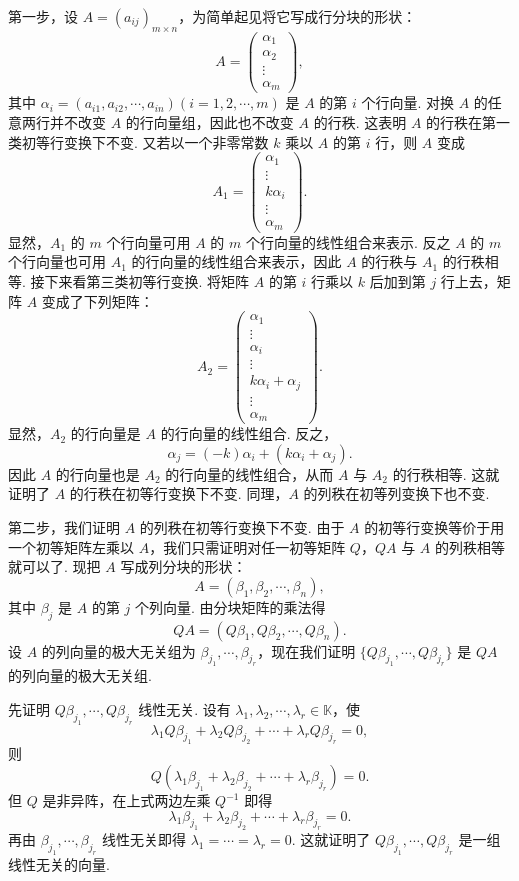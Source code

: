 \documentclass[UTF8, 12pt, fontset=fandol, oneside]{ctexart}
\begin{document}
第一步，设 $A=(a_{ij})_{m\times n}$，为简单起见将它写成行分块的形状：
\[
A=\left(\begin{array}{c}
\alpha_1\\
\alpha_2\\
\vdots\\
\alpha_m
\end{array}\right),
\]
其中 $\alpha_i=(a_{i1},a_{i2},\cdots,a_{in})(i=1,2,\cdots,m)$ 是 $A$ 的第 $i$ 个行向量. 对换 $A$ 的任意两行并不改变 $A$ 的行向量组，因此也不改变 $A$ 的行秩. 这表明 $A$ 的行秩在第一类初等行变换下不变. 又若以一个非零常数 $k$ 乘以 $A$ 的第 $i$ 行，则 $A$ 变成
\[
A_1=\left(\begin{array}{c}
\alpha_1\\
\vdots\\
k\alpha_i\\
\vdots\\
\alpha_m
\end{array}\right).
\]
显然，$A_1$ 的 $m$ 个行向量可用 $A$ 的 $m$ 个行向量的线性组合来表示. 反之 $A$ 的 $m$ 个行向量也可用 $A_1$ 的行向量的线性组合来表示，因此 $A$ 的行秩与 $A_1$ 的行秩相等. 接下来看第三类初等行变换. 将矩阵 $A$ 的第 $i$ 行乘以 $k$ 后加到第 $j$ 行上去，矩阵 $A$ 变成了下列矩阵：
\[
A_2=\left(\begin{array}{c}
\alpha_1\\
\vdots\\
\alpha_i\\
\vdots\\
k\alpha_i+\alpha_j\\
\vdots\\
\alpha_m
\end{array}\right).
\]
显然，$A_2$ 的行向量是 $A$ 的行向量的线性组合. 反之，
\[
\alpha_j=(-k)\alpha_i+(k\alpha_i+\alpha_j).
\]
因此 $A$ 的行向量也是 $A_2$ 的行向量的线性组合，从而 $A$ 与 $A_2$ 的行秩相等. 这就证明了 $A$ 的行秩在初等行变换下不变. 同理，$A$ 的列秩在初等列变换下也不变.

第二步，我们证明 $A$ 的列秩在初等行变换下不变. 由于 $A$ 的初等行变换等价于用一个初等矩阵左乘以 $A$，我们只需证明对任一初等矩阵 $Q$，$QA$ 与 $A$ 的列秩相等就可以了. 现把 $A$ 写成列分块的形状：
\[
A=(\beta_1,\beta_2,\cdots,\beta_n),
\]
其中 $\beta_j$ 是 $A$ 的第 $j$ 个列向量. 由分块矩阵的乘法得
\[
QA=(Q\beta_1,Q\beta_2,\cdots,Q\beta_n).
\]
设 $A$ 的列向量的极大无关组为 $\beta_{j_1},\cdots,\beta_{j_r}$，现在我们证明 $\{Q\beta_{j_1},\cdots,Q\beta_{j_r}\}$ 是 $QA$ 的列向量的极大无关组.

先证明 $Q\beta_{j_1},\cdots,Q\beta_{j_r}$ 线性无关. 设有 $\lambda_1,\lambda_2,\cdots,\lambda_r\in\mathbb{K}$，使
\[
\lambda_1Q\beta_{j_1}+\lambda_2Q\beta_{j_2}+\cdots+\lambda_rQ\beta_{j_r}=0,
\]
则
\[
Q(\lambda_1\beta_{j_1}+\lambda_2\beta_{j_2}+\cdots+\lambda_r\beta_{j_r})=0.
\]
但 $Q$ 是非异阵，在上式两边左乘 $Q^{-1}$ 即得
\[
\lambda_1\beta_{j_1}+\lambda_2\beta_{j_2}+\cdots+\lambda_r\beta_{j_r}=0.
\]
再由 $\beta_{j_1},\cdots,\beta_{j_r}$ 线性无关即得 $\lambda_1=\cdots=\lambda_r=0$. 这就证明了 $Q\beta_{j_1},\cdots,Q\beta_{j_r}$ 是一组线性无关的向量.
\end{document}

